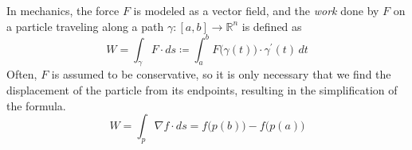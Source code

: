   \begin{example}[Work]
    \label{ex:work}
		In mechanics, the force $F$ is modeled as a vector field, and the \textit{work} done by $F$ on a particle traveling along a path $\gamma: [a, b] \to \mathbb{R}^n$ is defined as 
		\begin{equation}
		  W = \int_\gamma F \cdot ds \coloneqq \int_a^b F\big( \gamma(t)\big) \cdot \gamma^\prime (t) \, dt
		\end{equation}
		Often, $F$ is assumed to be conservative, so it is only necessary that we find the displacement of the particle from its endpoints, resulting in the simplification of the formula.  
		\begin{equation}
			W = \int_p \nabla f \cdot ds = f\big( p(b)\big) - f \big(p(a)\big)
		\end{equation}
  \end{example}
		

